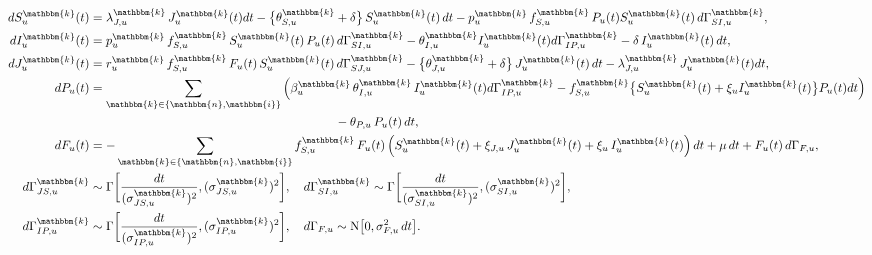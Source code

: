 \documentclass[aoas,preprint]{imsart}\usepackage[]{graphicx}\usepackage[]{xcolor}
\newcommand\unit{u}
\newcommand\species{\mathbbm{k}}
\newcommand\native{\mathbbm{n}}
\newcommand\invasive{\mathbbm{i}}
\newcommand\Normal{\mathrm{N}}
\begin{document}
{\small
\begin{align}
    dS^{\species}_{\unit}(t) &= \lambda^{\species}_{J,{\unit}} \,  J^{\species}_{\unit}(t)dt -
    \big\{
    \theta^{\species}_{S,{\unit}} + \delta
    \big\}
    \, S^{\species}_{\unit}(t)\, dt - p^{\species}_{\unit} \, f^{\species}_{S,{\unit}} \, P_{\unit}(t) S^{\species}_{\unit}(t) \, d\Gamma^{\species}_{SI,{\unit}},\\
    dI^{\species}_{\unit}(t) &= p^{\species}_{\unit} \, f^{\species}_{S,{\unit}}\,  S^{\species}_{\unit}(t) \, P_{\unit}(t)\, d\Gamma^{\species}_{SI,{\unit}} -
    \theta^{\species}_{I,{\unit}} I^{\species}_{\unit}(t)d\Gamma^{\species}_{IP,{\unit}}- \delta\, I^{\species}_{\unit}(t)\, dt,\\
    dJ^{\species}_{\unit}(t) &= r^{\species}_{\unit} \, f^{\species}_{S,{\unit}} \, F_{\unit}(t) \, S^{\species}_{\unit}(t)\, d\Gamma^{\species}_{SJ,{\unit}} -
    \big\{
    \theta^{\species}_{J,{\unit}}  + \delta
    \big\} 
    \, J^{\species}_{\unit}(t)\, dt - \lambda^{\species}_{J,{\unit}} \,  J^{\species}_{\unit}(t)dt, \\
    dP_{\unit}(t) &= \sum_{\species \in \{\native, \invasive\}} \left(\beta^{\species}_{\unit} \, \theta^{\species}_{I,{\unit}} \,  I^{\species}_{\unit}(t)d\Gamma^{\species}_{IP,{\unit}} - f^{\species}_{S,{\unit}} \big\{ S^{\species}_{\unit}(t) + \xi_{\unit} I^{\species}_{\unit}(t) \big\} P_{\unit}(t)dt\right) 
    \\ \nonumber & \hspace{7cm}
    - \theta_{P,{\unit}} \, P_{\unit}(t)\, dt,\\
    dF_{\unit}(t) &= - \sum_{\species \in \{\native, \invasive\}} f^{\species}_{S,{\unit}} \, F_{\unit}(t) \left(S^{\species}_{\unit}(t)+\xi_{J,{\unit}} \, J^{\species}_{\unit}(t) +\xi_{\unit} \, I^{\species}_{\unit}(t)\right)dt  + \mu \, dt + F_{\unit}(t)\, d\Gamma_{F,{\unit}},\\
d\Gamma^{\species}_{JS,{\unit}} &\sim \Gamma
  \bigg[\frac{dt}{(\sigma^{\species}_{JS,{\unit}})^{2}}, (\sigma^{\species}_{JS,{\unit}})^{2}\bigg],
\quad
d\Gamma^{\species}_{SI,{\unit}} \sim \Gamma
  \bigg[\frac{dt}{(\sigma^{\species}_{SI,{\unit}})^{2}}, (\sigma^{\species}_{SI,{\unit}})^{2}\bigg],\\
d\Gamma^{\species}_{IP,{\unit}} &\sim \Gamma
  \bigg[\frac{dt}{(\sigma^{\species}_{IP,{\unit}})^{2}}, (\sigma^{\species}_{IP,{\unit}})^{2}\bigg],
\quad
d\Gamma_{F,{\unit}} \sim \Normal \big[0, \sigma_{F,{\unit}}^{2}\, dt\big].
\end{align}
}

\end{document}

